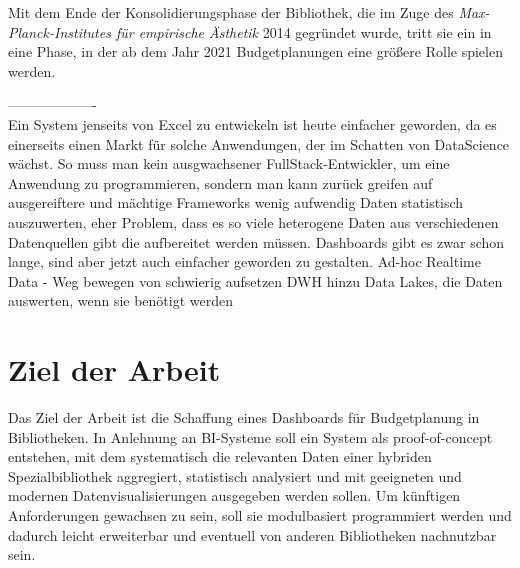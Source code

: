 Mit dem Ende der Konsolidierungsphase der
Bibliothek, die im Zuge des \textit{Max-Planck-Institutes für empirische
Ästhetik} 2014 gegründet wurde, tritt sie ein in eine Phase, in der ab dem Jahr
2021 Budgetplanungen eine größere Rolle spielen werden.

-------------------\\
Ein System jenseits von Excel zu entwickeln ist heute einfacher geworden, da es einerseits einen Markt für
solche Anwendungen, der im Schatten von DataScience wächst. So muss man kein ausgwachsener FullStack-Entwickler,
um eine Anwendung zu programmieren,
sondern man kann zurück greifen auf ausgereiftere und mächtige Frameworks
wenig aufwendig Daten statistisch auszuwerten, eher Problem, dass es so viele heterogene Daten aus verschiedenen Datenquellen
gibt die aufbereitet werden müssen. Dashboards gibt es zwar schon lange, sind aber jetzt auch einfacher geworden zu gestalten.
Ad-hoc Realtime Data - Weg bewegen von schwierig aufsetzen DWH hinzu Data Lakes, die Daten auswerten, wenn sie benötigt werden


\section{Ziel der Arbeit}
Das Ziel der Arbeit ist die Schaffung eines Dashboards für Budgetplanung in Bibliotheken. 
In Anlehnung an \acrfull{BI}-Systeme soll ein System als proof-of-concept entstehen,
mit dem systematisch die relevanten Daten einer hybriden Spezialbibliothek aggregiert, statistisch
analysiert und mit geeigneten und modernen Datenvisualisierungen ausgegeben werden sollen.
Um künftigen Anforderungen gewachsen zu sein, soll sie
modulbasiert programmiert werden und dadurch leicht erweiterbar und eventuell von
anderen Bibliotheken nachnutzbar sein.

